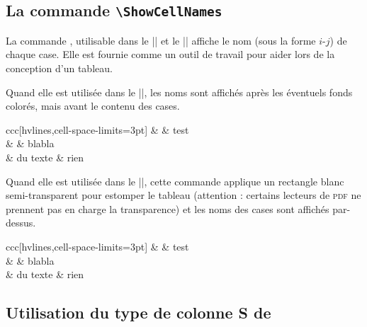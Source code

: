 \documentclass[dvipsnames]{article}
\begin{document}
\subsection{La commande \texttt{\textbackslash ShowCellNames}}


La commande , utilisable dans le |\CodeBefore|
et le |\CodeAfter| affiche le nom (sous la forme $i$-$j$) de chaque case. Elle est fournie
comme un outil de travail pour aider lors de la conception d'un tableau.

\medskip
Quand elle est utilisée dans le |\CodeBefore|, les noms sont affichés
après les éventuels fonds colorés, mais avant le contenu des cases.

\medskip
\begin{Code}[width=10.6cm,show-output]
\begin{NiceTabular}{ccc}[hvlines,cell-space-limits=3pt]
\CodeBefore
  \emph{\ShowCellNames}
\Body
   &          & test \\
                &          & blabla \\
                & du texte & rien
\end{NiceTabular}
\end{Code}

\bigskip
Quand elle est utilisée dans le |\CodeAfter|, cette commande applique un
rectangle blanc semi-transparent pour estomper le tableau (attention : certains
lecteurs de \textsc{pdf} ne prennent pas en charge la transparence) et les noms des cases
sont affichés par-dessus.

\medskip
\begin{Code}[width=10.6cm,show-output]
\begin{NiceTabular}{ccc}[hvlines,cell-space-limits=3pt]
\CodeBefore
\Body
   &           & test \\
                &           & blabla \\
                & du texte  & rien
\CodeAfter \emph{\ShowCellNames}
\end{NiceTabular}
\end{Code}



\subsection{Utilisation du type de colonne S de \texorpdfstring{}{siunitx}}
\end{document}
